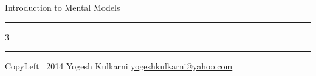 \documentclass[8pt,landscape]{article}
\begin{document}
\begin{center}
     \Large{Introduction to Mental Models}  %
\end{center}
\rule{\linewidth}{0.25pt}
\raggedright
\footnotesize
\begin{multicols}{3}


\rule{0.3\linewidth}{0.25pt}

\scriptsize
CopyLeft \textcopyleft\ 2014 Yogesh Kulkarni
\href{http://www.yogeshkulkarni.com}{yogeshkulkarni@yahoo.com}

\end{multicols}
\end{document}
